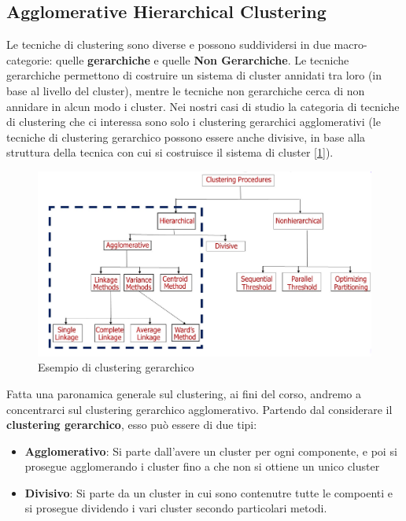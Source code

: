 \subsection{Agglomerative Hierarchical Clustering}
Le tecniche di clustering sono diverse e possono suddividersi in due macro-categorie: quelle \textbf{gerarchiche} e quelle \textbf{Non Gerarchiche}. Le tecniche gerarchiche permettono di costruire un sistema di cluster annidati tra loro (in base al livello del cluster), mentre le tecniche  non gerarchiche cerca di non annidare in alcun modo i cluster. Nei nostri casi di studio la categoria di tecniche di clustering che ci interessa sono solo i clustering gerarchici agglomerativi (le tecniche di clustering gerarchico possono essere anche divisive, in base alla struttura della tecnica con cui si costruisce il sistema di cluster [\ref{img:clustering-graph}]).

\begin{figure}[h]
\centering
\includegraphics[width=.8\textwidth]{img/clustering-graph.png}
\caption{Esempio di clustering gerarchico}\label{img:clustering-graph}
\end{figure}

Fatta una paronamica generale sul clustering, ai fini del corso, andremo a concentrarci sul clustering gerarchico agglomerativo. Partendo dal considerare il \textbf{clustering gerarchico}, esso può essere di due tipi:
\begin{itemize}
    \item \textbf{Agglomerativo}: Si parte dall'avere un cluster per ogni componente, e poi si prosegue agglomerando i cluster fino a che non si ottiene un unico cluster
    \item \textbf{Divisivo}: Si parte da un cluster in cui sono contenutre tutte le compoenti e si prosegue dividendo i vari cluster secondo particolari metodi.
\end{itemize}

